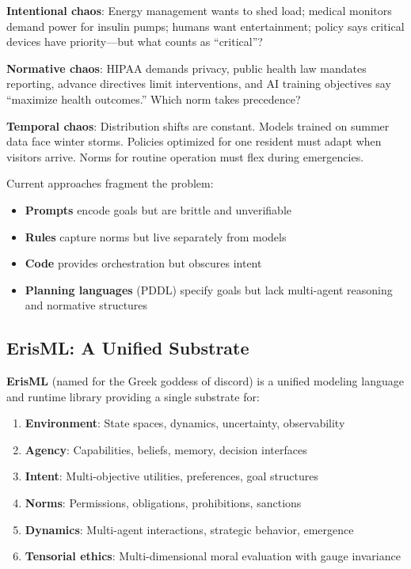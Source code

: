 \documentclass[conference]{IEEEtran}
\begin{document}
\textbf{Intentional chaos}: Energy management wants to shed load;
medical monitors demand power for insulin pumps; humans want
entertainment; policy says critical devices have priority---but what
counts as ``critical''?

\textbf{Normative chaos}: HIPAA demands privacy, public health law
mandates reporting, advance directives limit interventions, and AI
training objectives say ``maximize health outcomes.'' Which norm takes
precedence?

\textbf{Temporal chaos}: Distribution shifts are constant. Models
trained on summer data face winter storms. Policies optimized for one
resident must adapt when visitors arrive. Norms for routine operation
must flex during emergencies.

Current approaches fragment the problem:
\begin{itemize}
\item \textbf{Prompts} encode goals but are brittle and unverifiable
\item \textbf{Rules} capture norms but live separately from models
\item \textbf{Code} provides orchestration but obscures intent
\item \textbf{Planning languages} (PDDL) specify goals but lack multi-agent reasoning and normative structures
\end{itemize}

\subsection{ErisML: A Unified Substrate}

\textbf{ErisML} (named for the Greek goddess of discord) is a
unified modeling language and runtime library providing a single substrate for:

\begin{enumerate}
\item \textbf{Environment}: State spaces, dynamics, uncertainty, observability
\item \textbf{Agency}: Capabilities, beliefs, memory, decision interfaces
\item \textbf{Intent}: Multi-objective utilities, preferences, goal structures
\item \textbf{Norms}: Permissions, obligations, prohibitions, sanctions
\item \textbf{Dynamics}: Multi-agent interactions, strategic behavior, emergence
\item \textbf{Tensorial ethics}: Multi-dimensional moral evaluation with gauge invariance
\end{enumerate}
\end{document}
